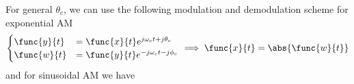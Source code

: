 For general \(\theta_c\), we can use the following modulation and demodulation scheme for exponential AM
\begin{equation*}
    \begin{cases} 
        \func{y}{t} &= \func{x}{t} e^{j\omega_c t + j\theta_c}\\
        \func{w}{t} &= \func{y}{t} e^{-j\omega_ct -j \phi_c} 
    \end{cases} \implies \func{x}{t} = \abs{\func{w}{t}}
\end{equation*}
and for sinusoidal AM we have